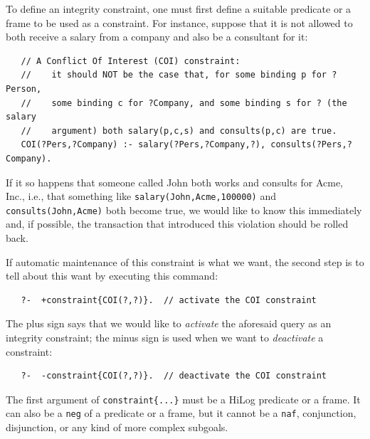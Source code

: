 To define an integrity constraint, one must first define a suitable 
predicate or a frame to be used as a constraint.
For instance, suppose that it is not allowed to both receive a salary from a
company and also be a consultant for it:
\begin{verbatim}
   // A Conflict Of Interest (COI) constraint:
   //    it should NOT be the case that, for some binding p for ?Person,
   //    some binding c for ?Company, and some binding s for ? (the salary
   //    argument) both salary(p,c,s) and consults(p,c) are true.
   COI(?Pers,?Company) :- salary(?Pers,?Company,?), consults(?Pers,?Company).
\end{verbatim}
If it so happens that someone called John both works and consults for
Acme, Inc., i.e., that something like \texttt{salary(John,Acme,100000)}  
and \texttt{consults(John,Acme)} both become true, we would like to know
this immediately and, if possible, the transaction that introduced this
violation should be rolled back.

If automatic maintenance of this constraint is what we want, the second step
is to tell \ERGO about this want by executing this command:
\begin{verbatim}
   ?-  +constraint{COI(?,?)}.  // activate the COI constraint
\end{verbatim}
The plus sign says that we would like to \emph{activate} the aforesaid query as an
integrity constraint; the minus sign is used when we want to
\emph{deactivate}  a constraint:
\begin{verbatim}
   ?-  -constraint{COI(?,?)}.  // deactivate the COI constraint
\end{verbatim}
The first argument of \texttt{constraint\{...\}} must be a HiLog predicate
or a frame. It can also be a \texttt{\bs{}neg} of a predicate or a frame, but
it cannot be a \texttt{\bs{}naf}, conjunction, disjunction, or any kind of
more complex subgoals.

